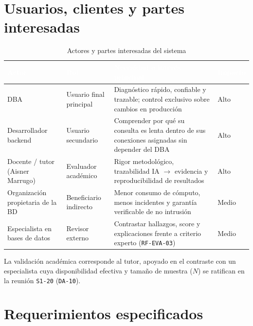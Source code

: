 \documentclass[12pt,a4paper]{article}
\begin{document}
\section{Usuarios, clientes y partes interesadas}

\begingroup
{}
\begin{table}[H]
\centering
\small
\begin{tabularx}{\textwidth}{p{} p{} X p{}}
\toprule
\rowcolor{utbblue}
\textcolor{white}{\textbf{Actor}} & \textcolor{white}{\textbf{Rol}} & \textcolor{white}{\textbf{Necesidad o interés principal}} & \textcolor{white}{\textbf{Impacto}} \\
\midrule
DBA & Usuario final principal & Diagnóstico rápido, confiable y trazable; control exclusivo sobre cambios en producción & Alto \\
Desarrollador backend & Usuario secundario & Comprender por qué su consulta es lenta dentro de sus conexiones asignadas sin depender del DBA & Alto \\
Docente / tutor (Aisner Marrugo) & Evaluador académico & Rigor metodológico, trazabilidad IA $\rightarrow$ evidencia y reproducibilidad de resultados & Alto \\
Organización propietaria de la BD & Beneficiario indirecto & Menor consumo de cómputo, menos incidentes y garantía verificable de no intrusión & Medio \\
Especialista en bases de datos & Revisor externo & Contrastar hallazgos, score y explicaciones frente a criterio experto (\texttt{RF-EVA-03}) & Medio \\
\bottomrule
\end{tabularx}
\caption{Actores y partes interesadas del sistema}
\label{tab:actores}
\end{table}
\endgroup

La validación académica corresponde al tutor, apoyado en el contraste con un especialista cuya disponibilidad efectiva y tamaño de muestra ($N$) se ratifican en la reunión \texttt{S1-20} (\texttt{DA-10}).

\section{Requerimientos especificados}
\end{document}
